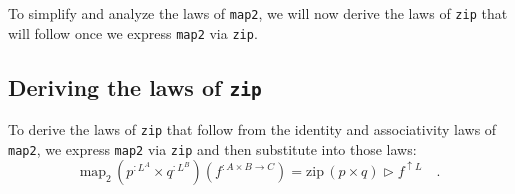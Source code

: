 To simplify and analyze the laws of \lstinline!map2!, we will now
derive the laws of \lstinline!zip! that will follow once we express
\lstinline!map2! via \lstinline!zip!.

\subsection{Deriving the laws of \texttt{zip}\label{subsec:Deriving-the-laws-of-zip}}

To derive the laws of \lstinline!zip! that follow from the identity
and associativity laws of \lstinline!map2!, we express \lstinline!map2!
via \lstinline!zip! and then substitute into those laws:
\begin{equation}
\text{map}_{2}\,(p^{:L^{A}}\times q^{:L^{B}})(f^{:A\times B\rightarrow C})=\text{zip}\,(p\times q)\triangleright f^{\uparrow L}\quad.\label{eq:express-map2-via-zip}
\end{equation}

